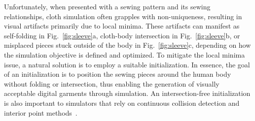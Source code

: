 \documentclass[acmtog,anonymous,review]{acmart}
\begin{document}
Unfortunately, when presented with a sewing pattern and its sewing relationships, cloth simulation often grapples with non-uniqueness, resulting in visual artifacts primarily due to local minima. These artifacts can manifest as self-folding in Fig.~\ref{fig:sleeve}a, cloth-body intersection in Fig.~\ref{fig:sleeve}b, or misplaced pieces stuck outside of the body in Fig.~\ref{fig:sleeve}c, depending on how the simulation objective is defined and optimized. To mitigate the local minima issue, a natural solution is to employ a suitable initialization. In essence, the goal of an initialization is to position the sewing pieces around the human body without folding or intersection, thus enabling the generation of visually acceptable digital garments through simulation. An intersection-free initialization is also important to simulators that rely on continuous collision detection and interior point methods~\cite{Li:2020:IPC}.



\end{document}
